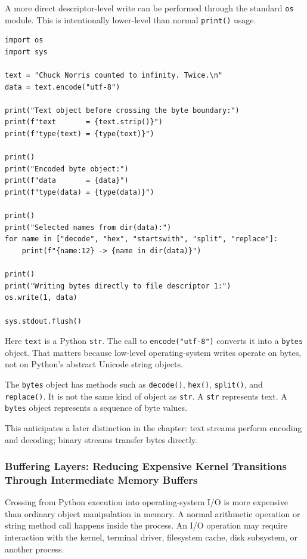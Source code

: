 A more direct descriptor-level write can be performed through the standard \texttt{os} module. This is intentionally lower-level than normal \texttt{print()} usage.

\begin{verbatim}
import os
import sys

text = "Chuck Norris counted to infinity. Twice.\n"
data = text.encode("utf-8")

print("Text object before crossing the byte boundary:")
print(f"text       = {text.strip()}")
print(f"type(text) = {type(text)}")

print()
print("Encoded byte object:")
print(f"data       = {data}")
print(f"type(data) = {type(data)}")

print()
print("Selected names from dir(data):")
for name in ["decode", "hex", "startswith", "split", "replace"]:
    print(f"{name:12} -> {name in dir(data)}")

print()
print("Writing bytes directly to file descriptor 1:")
os.write(1, data)

sys.stdout.flush()
\end{verbatim}

Here \texttt{text} is a Python \texttt{str}. The call to \texttt{encode("utf-8")} converts it into a \texttt{bytes} object. That matters because low-level operating-system writes operate on bytes, not on Python's abstract Unicode string objects.

The \texttt{bytes} object has methods such as \texttt{decode()}, \texttt{hex()}, \texttt{split()}, and \texttt{replace()}. It is not the same kind of object as \texttt{str}. A \texttt{str} represents text. A \texttt{bytes} object represents a sequence of byte values.

This anticipates a later distinction in the chapter: text streams perform encoding and decoding; binary streams transfer bytes directly.

\subsubsection{Buffering Layers: Reducing Expensive Kernel Transitions Through Intermediate Memory Buffers}

Crossing from Python execution into operating-system I/O is more expensive than ordinary object manipulation in memory. A normal arithmetic operation or string method call happens inside the process. An I/O operation may require interaction with the kernel, terminal driver, filesystem cache, disk subsystem, or another process.

